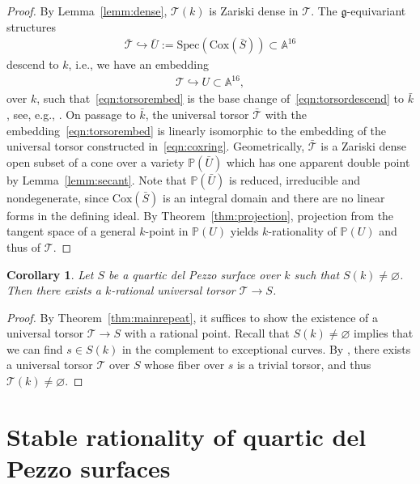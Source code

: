 \documentclass[12pt, reqno]{amsart}
\theoremstyle{plain}
\newtheorem{coro}[prop]{Corollary}
\theoremstyle{remark}
\theoremstyle{definition}
\numberwithin{equation}{section}
\def\cT{{\mathcal T}}
\def\bA{{\mathbb A}}
\def\bP{{\mathbb P}}
\def\Cox{\mathrm{Cox}}
\def\Spec{\mathrm{Spec}}
\begin{document}
\begin{proof}
By Lemma~\ref{lemm:dense}, $\cT(k)$ is Zariski dense in $\cT$.
The $\mathfrak g$-equivariant structures
\begin{align}\label{eqn:torsorembed}
    \bar{\cT}\hookrightarrow \bar{U}:=\Spec(\Cox(\bar{S}))\subset \bA^{16}
\end{align}
descend to $k$, i.e., we have 
an embedding
\begin{align}\label{eqn:torsordescend}
\cT\hookrightarrow U\subset \bA^{16},
\end{align}
over $k$, such that~\eqref{eqn:torsorembed} is the base change of~\eqref{eqn:torsordescend} to $\bar k$, see, e.g., \cite[Remark 4.5]{derenthal-non}.
On passage to $\bar{k}$, the universal torsor $\bar\cT$ with the embedding~\eqref{eqn:torsorembed} is linearly isomorphic to the embedding of the universal torsor constructed in~\eqref{eqn:coxring}. Geometrically, $\bar{\cT}$ is a Zariski dense open subset of a cone over a variety $\bP(\bar{U})$ which 
has one apparent double point by Lemma~\ref{lemm:secant}. Note that $\bP(\bar{U})$ is reduced, irreducible and nondegenerate, since $\Cox(\bar S)$ is an integral domain and there are no linear forms in the defining ideal. 
By Theorem~\ref{thm:projection}, projection from the tangent space of a general $k$-point in $\bP(U)$ yields $k$-rationality of $\bP(U)$ and thus of $\cT$. 
\end{proof}


\begin{coro}\label{coro:rattorsor}
    Let $S$ be a quartic del Pezzo surface over $k$ such that $S(k)\ne \varnothing$. Then there exists a $k$-rational universal torsor $\cT\to S$.
\end{coro}
\begin{proof}
    By Theorem~\ref{thm:mainrepeat}, it suffices to show the existence of a universal torsor $\cT\to S$ with a rational point. Recall that $S(k)\ne \varnothing$ implies that we can find $s\in S(k)$ in the complement to exceptional curves. By \cite[Corollary 2.3.4]{CTSansucDuke}, there exists a universal torsor $\cT$ over $S$ whose fiber over $s$ is a trivial torsor, and thus $\cT(k)\ne \varnothing$.
\end{proof}





\section{Stable rationality of quartic del Pezzo surfaces}
\label{sect:stab-rat}
\end{document}
